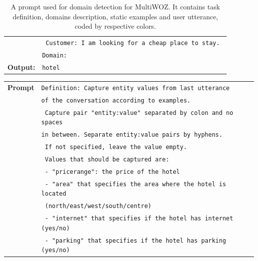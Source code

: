 \begin{table}[tp]
\begin{tabular}{rl}
& \texttt{{\color{orange!50!yellow!90!black!100!} Customer: I am looking for a cheap place to stay. }}\\
& \texttt{Domain:} \\
      \midrule
      \textbf{Output:} & \texttt{hotel} \\
      \bottomrule
  \end{tabular}
    \caption{A prompt used for domain detection for MultiWOZ.
  It contains {\color{cyan!80!yellow!80!black!100} task definition},  {\color{green!100!yellow!70!black!100!}domains description}, {\color{red!50!yellow!90!black!100!} static examples} and {\color{orange!50!yellow!90!black!100!} user utterance}, coded by respective colors.}
  \label{07_tab:domain}
\end{table}

\begin{table}[tp]
    \centering\small
    \begin{tabular}{rl}
      \toprule
      \textbf{Prompt} & \texttt{{\color{cyan!80!yellow!80!black!100 }Definition: Capture entity values from last utterance}}\\
      & \texttt{{\color{cyan!80!yellow!80!black!100 }of the conversation according to examples.}} \\
    & \texttt{{\color{cyan!80!yellow!80!black!100 } Capture pair "entity:value" separated by colon and no spaces}}\\ 
    & \texttt{{\color{cyan!80!yellow!80!black!100 }in between. Separate entity:value pairs by hyphens.}} \\
      & \texttt{{\color{cyan!80!yellow!80!black!100!} If not specified, leave the value empty.}}\\ 
      & \texttt{{\color{cyan!80!yellow!80!black!100!} Values that should be captured are: }} \\
      & \texttt{{\color{green!100!yellow!70!black!100!} - "pricerange": the price of the hotel} }\\
      & \texttt{{\color{green!100!yellow!70!black!100!} - "area" that specifies the area where the hotel is located}} \\
      & \texttt{{\color{green!100!yellow!70!black!100!}
      (north/east/west/south/centre)}} \\
      & \texttt{{\color{green!100!yellow!70!black!100!} - "internet" that specifies if the hotel has internet (yes/no)}} \\
      & \texttt{{\color{green!100!yellow!70!black!100!} - "parking" that specifies if the hotel has parking (yes/no)}} \\

\end{tabular}
\end{table}
